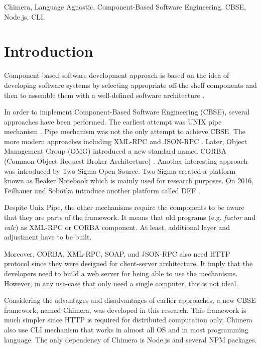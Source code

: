 \documentclass[conference]{IEEEtran}
\begin{document}
\begin{IEEEkeywords}
Chimera, Language Agnostic, Component-Based Software Engineering, CBSE, Node.js, CLI.
\end{IEEEkeywords}

\IEEEpeerreviewmaketitle

\section{Introduction}

Component-based software development approach is based on the idea of developing 
software systems by selecting appropriate off-the shelf components and then to 
assemble them with a well-defined software architecture \cite{kaur2010component}.

In order to implement Component-Based Software Engineering (CBSE), several 
approaches have been performed. The earliest attempt was UNIX pipe mechanism 
\cite{mcilroy1968mass}. Pipe mechanism was not the only attempt to achieve CBSE.
The more modern approaches including XML-RPC \cite{xmlrpc} and JSON-RPC \cite{jsonrpc}. 
Later, Object Management Group (OMG) introduced a new standard named CORBA (Common
Object Request Broker Architecture) \cite{corba}. Another interesting approach was 
introduced by Two Sigma Open Source. Two Sigma created a platform known as Beaker
Notebook \cite{beakernotebook} which is mainly used for research purposes. 
On 2016, Feilhauer and Sobotka introduce another platform called DEF 
\cite{feilhauer2016def}.

Despite Unix Pipe, the other mechanisms require the components to be aware that 
they are parts of the framework. It means that old programs (e.g.
{\it factor} and {\it calc}) as XML-RPC or CORBA component. At least, additional layer
and adjustment have to be built.

Moreover, CORBA, XML-RPC, SOAP, and JSON-RPC also need HTTP protocol since they were designed for 
client-server architecture. It imply that the developers need to build a web server for being able 
to use the mechanisms. However, in any use-case that only need a single computer,
this is not ideal.

Considering the advantages and disadvantages of earlier approaches, a new CBSE framework, 
named Chimera, was developed in this research. This framework is much simpler since
HTTP is required for distributed computation only. Chimera also use CLI mechanism that
works in almost all OS and in most programming language.
The only dependency of Chimera is Node.js and several NPM packages.
\end{document}
